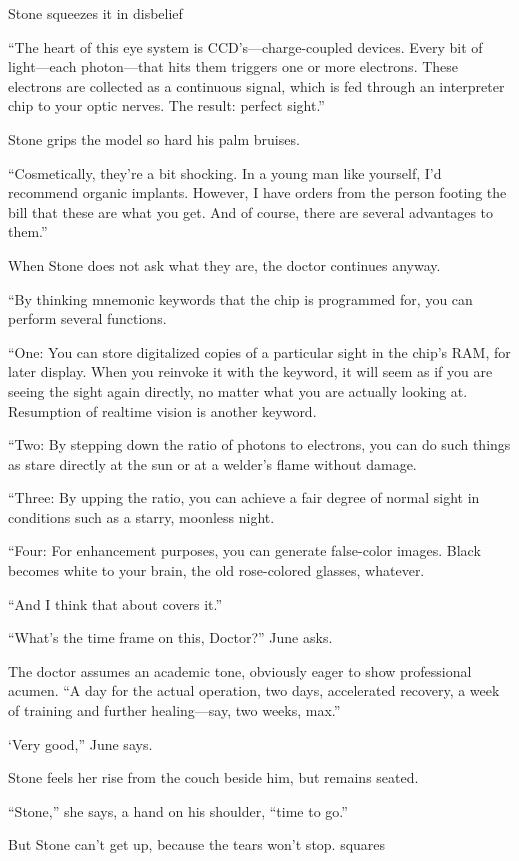 Stone squeezes it in disbelief

“The heart of this eye system is CCD’s—charge-coupled devices. Every bit of light—each photon—that hits them triggers one or more electrons. These electrons are collected as a continuous signal, which is fed through an interpreter chip to your optic nerves. The result: perfect sight.”

Stone grips the model so hard his palm bruises.

“Cosmetically, they’re a bit shocking. In a young man like yourself, I’d recommend organic implants. However, I have orders from the person footing the bill that these are what you get. And of course, there are several advantages to them.”

When Stone does not ask what they are, the doctor continues anyway.

“By thinking mnemonic keywords that the chip is programmed for, you can perform several functions.

“One: You can store digitalized copies of a particular sight in the chip’s RAM, for later display. When you reinvoke it with the keyword, it will seem as if you are seeing the sight again directly, no matter what you are actually looking at. Resumption of realtime vision is another keyword.

“Two: By stepping down the ratio of photons to electrons, you can do such things as stare directly at the sun or at a welder’s flame without damage.

“Three: By upping the ratio, you can achieve a fair degree of normal sight in conditions such as a starry, moonless night.

“Four: For enhancement purposes, you can generate false-color images. Black becomes white to your brain, the old rose-colored glasses, whatever.

“And I think that about covers it.”

“What’s the time frame on this, Doctor?” June asks.

The doctor assumes an academic tone, obviously eager to show professional acumen. “A day for the actual operation, two days, accelerated recovery, a week of training and further healing—say, two weeks, max.”

‘Very good,” June says.

Stone feels her rise from the couch beside him, but remains seated.

“Stone,” she says, a hand on his shoulder, “time to go.”

But Stone can’t get up, because the tears won’t stop.
squares

